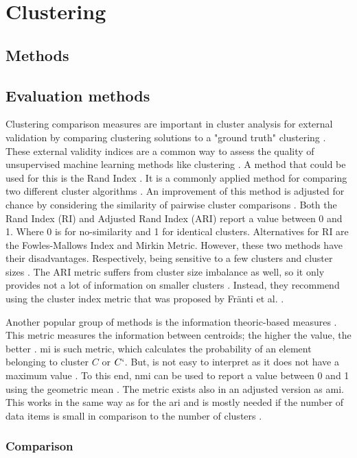 \section{Clustering}

\subsection{Methods}
\subsection{Evaluation methods} \label{theory:evaluate}
Clustering comparison measures are important in cluster analysis for external validation by comparing clustering solutions to a "ground truth" clustering \citep{vinh_information_nodate-2}.
These external validity indices are a common way to assess the quality of unsupervised machine learning methods like clustering \citep{warrens_understanding_2022}.
A method that could be used for this is the Rand Index \cite{rand_objective_1971}.
It is a commonly applied method for comparing two different cluster algorithms \cite{wagner_comparing_nodate}.
An improvement of this method is adjusted for chance by considering the similarity of pairwise cluster comparisons \cite{vinh_information_nodate-2}.
Both the Rand Index (RI) and Adjusted Rand Index (ARI) \citep{hubert_comparing_1985-1} report a value between 0 and 1.
Where 0 is for no-similarity and 1 for identical clusters.
Alternatives for RI are the Fowles-Mallows Index and Mirkin Metric.
However, these two methods have their disadvantages. Respectively, being sensitive to a few clusters and cluster sizes \citep{wagner_comparing_nodate}.
The ARI metric suffers from cluster size imbalance as well, so it only provides not a lot of information on smaller clusters \citep{warrens_understanding_2022}.
Instead, they recommend using the cluster index metric that was proposed by Fränti et al. \citep{franti_centroid_2014}.

Another popular group of methods is the information theoric-based measures \citep{vinh_information_nodate-2}.
This metric measures the information between centroids; the higher the value, the better \citep{vinh_information_nodate-2}.
\gls{mi} is such metric, which calculates the probability of an element belonging to cluster $C$ or $C`$.
But, is not easy to interpret as it does not have a maximum value \citep{wagner_comparing_nodate}.
To this end, \gls{nmi} can be used to report a value between 0 and 1 using the geometric mean \citep{strehl_cluster_2002}.
The metric exists also in an adjusted version as \gls{ami}.
This works in the same way as for the \gls{ari} and is mostly needed if the number of data items is small in comparison to the number of clusters \citep{vinh_information_nodate-2}. \newline

\subsubsection{Comparison}
